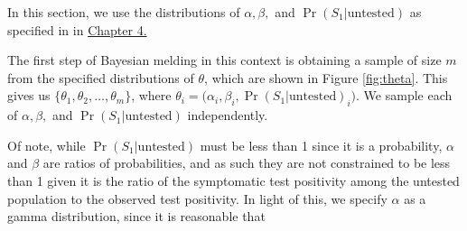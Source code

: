 \documentclass[12pt,twoside]{smiththesis}
\begin{document}
In this section, we use the distributions of \(\alpha,\beta,\) and \(\Pr(S_1|\text{untested})\) as specified in in \protect\hyperlink{defpriors}{Chapter 4.}

\newpage

The first step of Bayesian melding in this context is obtaining a sample of size \(m\) from the specified distributions of \(\theta\), which are shown in Figure \ref{fig:theta}. This gives us \(\{ \theta_1, \theta_2, \dots, \theta_m\}\), where \(\theta_i = \Big(\alpha_i,\beta_i,\Pr(S_1|\text{untested})_i\Big)\). We sample each of \(\alpha,\beta,\) and \(\Pr(S_1|\text{untested})\) independently.

Of note, while \(\Pr(S_1|\text{untested})\) must be less than 1 since it is a probability, \(\alpha\) and \(\beta\) are ratios of probabilities, and as such they are not constrained to be less than 1 given it is the ratio of the symptomatic test positivity among the untested population to the observed test positivity. In light of this, we specify \(\alpha\) as a gamma distribution, since it is reasonable that
\end{document}
